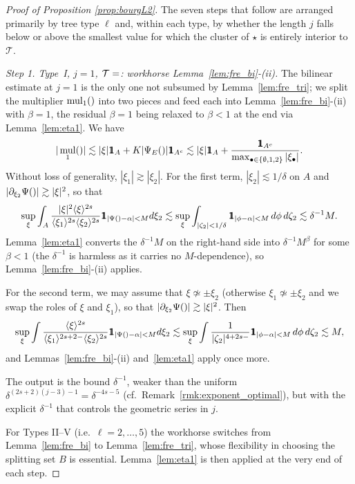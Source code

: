 \documentclass[a4paper,
11pt,  reqno]{amsart}
\makeatletter
\newcommand{\mathbbm}[1]{\mathchoice%
    {\hbox{\sffamily 1\kern-.40em 1}}%
    {\hbox{\sffamily 1\kern-.40em 1}}%
    {\hbox{\scriptsize\sffamily 1\kern-.30em 1}}%
    {\hbox{\tiny\sffamily 1\kern-.25em 1}}}%
\newcommand{\jap}[1]{\langle #1 \rangle}
\newcommand{\5}{\textup{V}}
\newcommand{\noi}{\noindent}
\newcommand{\ind}{\mathbbm 1}
\theoremstyle{remark}
\newcommand{\bul}{\bullet}
\newcommand{\TT}{\mathcal{T}}
\DeclareMathOperator{\mul}{mul}
\def\<#1>{\csname MH@symb@#1\endcsname}
\numberwithin{equation}{section}
\numberwithin{theorem}{section}
\makeatother
\begin{document}
\begin{proof}[Proof of Proposition \ref{prop:bourgL2}]
The seven steps that follow are arranged primarily by tree type $\ell$ and, within each type, by whether the length $j$ falls below or above the smallest value for which the cluster of $\star$ is entirely interior to $\TT$.

\medskip

\noi\textit{Step 1. Type~I, $j=1$, $\TT=\<1>$: workhorse Lemma~\ref{lem:fre_bi}-(ii).} The bilinear estimate at $j=1$ is the only one not subsumed by Lemma~\ref{lem:fre_tri}; we split the multiplier $\mul_1(\<1>)$ into two pieces and feed each into Lemma~\ref{lem:fre_bi}-(ii) with $\beta=1$, the residual $\beta=1$ being relaxed to $\beta<1$ at the end via Lemma~\ref{lem:eta1}.
We have
$$
|\mul_1(\<1>)|\lesssim |\xi|\ind_A + K|\Psi_E(\<1>)|\ind_{A^c} \lesssim |\xi|\ind_A + \frac{\ind_{A^c}}{\max_{\bul\in\{\emptyset, 1, 2\}}|\xi_\bul|}.
$$
Without loss of generality, $|\xi_1|\gtrsim |\xi_2|$.
For the first term, $|\xi_2|\lesssim 1/\delta$ on $A$ and $|\partial_{\xi_2}\Psi(\<1>)|\gtrsim |\xi|^2$, so that
$$
\sup_\xi \int_A \frac{|\xi|^2\jap{\xi}^{2s}}{\jap{\xi_1}^{2s}\jap{\xi_2}^{2s}} \ind_{|\Psi(\<1>)-\alpha|<M} d\xi_2 \lesssim \sup_\xi \int_{|\zeta_2|<1/\delta}  \ind_{|\phi-\alpha|<M} \,d\phi\, d\zeta_2 \lesssim \delta^{-1}M.
$$
Lemma~\ref{lem:eta1} converts the $\delta^{-1}M$ on the right-hand side into $\delta^{-1}M^\beta$ for some $\beta<1$ (the $\delta^{-1}$ is harmless as it carries no $M$-dependence), so Lemma~\ref{lem:fre_bi}-(ii) applies.

For the second term, we may assume that $\xi\not\simeq \pm \xi_2$ (otherwise $\xi_1\not\simeq \pm \xi_2$ and we swap the roles of $\xi$ and $\xi_1$), so that $|\partial_{\xi_2}\Psi(\<1>)|\gtrsim |\xi|^2$. Then
$$
\sup_\xi \int \frac{\jap{\xi}^{2s}}{\jap{\xi_1}^{2s+2-}\jap{\xi_2}^{2s}} \ind_{|\Psi(\<1>)-\alpha|<M} d\xi_2 \lesssim \sup_\xi \int \frac{1}{|\zeta_2|^{4+2s-}} \ind_{|\phi-\alpha|<M}\,d\phi\, d\zeta_2 \lesssim M,
$$
and Lemmas~\ref{lem:fre_bi}-(ii) and~\ref{lem:eta1} apply once more.

The output is the bound $\delta^{-1}$, weaker than the uniform $\delta^{(2s+2)(j-3)-1}=\delta^{-4s-5}$ (cf.\ Remark~\ref{rmk:exponent_optimal}), but with the explicit $\delta^{-1}$ that controls the geometric series in $j$.

\medskip

For Types II--V (i.e.\ $\ell=2,\dots,5$) the workhorse switches from Lemma~\ref{lem:fre_bi} to Lemma~\ref{lem:fre_tri}, whose flexibility in choosing the splitting set $B$ is essential. Lemma~\ref{lem:eta1} is then applied at the very end of each step.


\end{proof}
\end{document}
